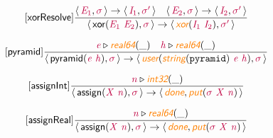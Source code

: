 \documentclass[10pt,leqno,fleqn]{article}
\newcommand{\artVariable}[1]{\mbox{\color{purple}\em #1\/}}
\newcommand{\artConstructor}[1]{\mbox{\sf #1}}
\newcommand{\artCaseInsensitiveLiteral}[1]{\mbox{\tt #1}}
\newcommand{\artSpecial}[1]{\mbox{\color{orange}\sf\em #1}}
\begin{document}
\begin{equation}
\tag*{[\artConstructor{\sf xorResolve}]}
\begin{split}\frac{\langle\, \artVariable{E$_{1}$}, \artVariable{$\sigma$}\,\rangle \rightarrow \langle\, \artVariable{I$_{1}$}, \artVariable{$\sigma$\/$^\prime$}\,\rangle \quad \langle\, \artVariable{E$_{2}$}, \artVariable{$\sigma$}\,\rangle \rightarrow \langle\, \artVariable{I$_{2}$}, \artVariable{$\sigma$\/$^\prime$}\,\rangle }{\langle\, \artConstructor{\sf xor}(\artVariable{E$_{1}$}\ \artVariable{E$_{2}$}), \artVariable{$\sigma$}\,\rangle \rightarrow \langle\, \artSpecial{xor}(\artVariable{I$_{1}$}\ \artVariable{I$_{2}$}), \artVariable{$\sigma$\/$^\prime$}\,\rangle }
\end{split}
\end{equation}

\begin{equation}
\tag*{[\artConstructor{\sf pyramid}]}
\begin{split}\frac{ \artVariable{e}\triangleright \artSpecial{real64}(\_) \quad  \artVariable{h}\triangleright \artSpecial{real64}(\_) }{\langle\, \artConstructor{\sf pyramid}(\artVariable{e}\ \artVariable{h}), \artVariable{$\sigma$}\,\rangle \rightarrow \langle\, \artSpecial{user}(\artSpecial{string}(\artCaseInsensitiveLiteral{pyramid})\ \artVariable{e}\ \artVariable{h}), \artVariable{$\sigma$}\,\rangle }
\end{split}
\end{equation}

\begin{equation}
\tag*{[\artConstructor{\sf assignInt}]}
\begin{split}\frac{ \artVariable{n}\triangleright \artSpecial{int32}(\_) }{\langle\, \artConstructor{\sf assign}(\artVariable{X}\ \artVariable{n}), \artVariable{$\sigma$}\,\rangle \rightarrow \langle\, \artSpecial{done}, \artSpecial{put}(\artVariable{$\sigma$}\ \artVariable{X}\ \artVariable{n})\,\rangle }
\end{split}
\end{equation}

\begin{equation}
\tag*{[\artConstructor{\sf assignReal}]}
\begin{split}\frac{ \artVariable{n}\triangleright \artSpecial{real64}(\_) }{\langle\, \artConstructor{\sf assign}(\artVariable{X}\ \artVariable{n}), \artVariable{$\sigma$}\,\rangle \rightarrow \langle\, \artSpecial{done}, \artSpecial{put}(\artVariable{$\sigma$}\ \artVariable{X}\ \artVariable{n})\,\rangle }
\end{split}
\end{equation}
\end{document}
